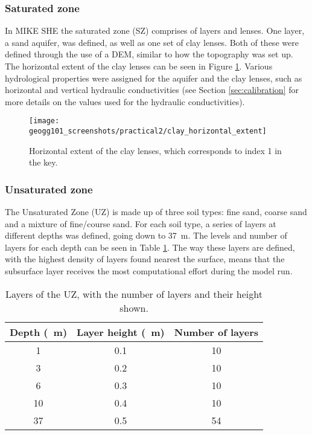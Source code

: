 \documentclass{article}
\begin{document}
\subsubsection{Saturated zone}

In MIKE SHE the saturated zone (SZ) comprises of layers and lenses. One layer, a sand aquifer, was defined, as well as one set of clay lenses. Both of these were defined through the use of a DEM, similar to how the topography was set up. The horizontal extent of the clay lenses can be seen in Figure \ref{fig:clay_horizontal_extent}. Various hydrological properties were assigned for the aquifer and the clay lenses, such as horizontal and vertical hydraulic conductivities (see Section \ref{sec:calibration} for more details on the values used for the hydraulic conductivities).

\begin{figure}[!h]
    \centering
    \texttt{[image: geogg101\_screenshots/practical2/clay\_horizontal\_extent]}
    \caption{Horizontal extent of the clay lenses, which corresponds to index 1 in the key.}
    \label{fig:clay_horizontal_extent}
\end{figure}

\subsubsection{Unsaturated zone}

The Unsaturated Zone (UZ) is made up of three soil types: fine sand, coarse sand and a mixture of fine/course sand. For each soil type, a series of layers at different depths was defined, going down to \SI{37}{m}. The levels and number of layers for each depth can be seen in Table \ref{table:uz_depths}. The way these layers are defined, with the highest density of layers found nearest the surface, means that the subsurface layer receives the most computational effort during the model run.

\setlength\extrarowheight{3pt}
\begin{table}[!h]
    \centering
    \begin{tabular}{c c c}
	Depth (\SI{}{m})  & Layer height (\SI{}{m}) & Number of layers \\
	    \hline
	    1 & 0.1 & 10 \\
	    3 & 0.2 & 10 \\
	    6 & 0.3 & 10 \\
	    10 & 0.4 & 10 \\
	    37 & 0.5 & 54 \\
    \end{tabular}
    \caption{Layers of the UZ, with the number of layers and their height shown.}
    \label{table:uz_depths}
\end{table}
\end{document}
